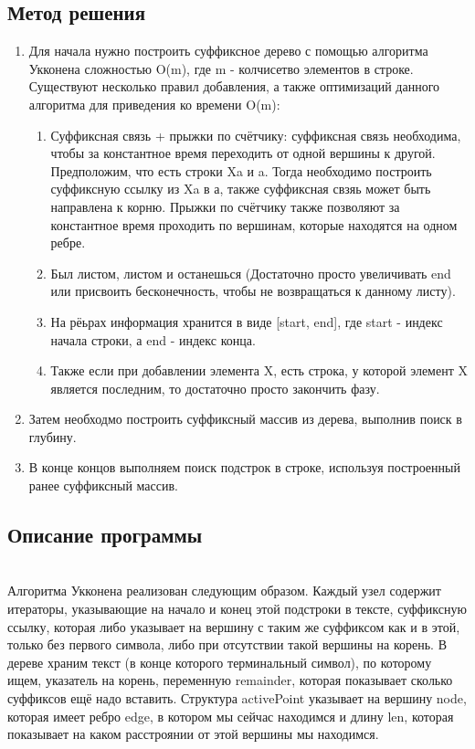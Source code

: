 \documentclass[12pt]{article}
\begin{document}
\subsection*{Метод решения}

\begin{enumerate}
\item Для начала нужно построить суффиксное дерево с помощью алгоритма Укконена сложностью O(m), где m - колчисетво элементов в строке.\\

Существуют несколько правил добавления, а также оптимизаций данного алгоритма для приведения ко времени O(m): 
\begin{enumerate}
    \item Суффиксная связь + прыжки по счётчику: суффиксная связь необходима, чтобы за константное время переходить от одной вершины к другой. Предположим, что есть строки Xa и a. Тогда необходимо построить суффиксную ссылку из Xa в а, также суффиксная свзяь может быть направлена к корню. Прыжки по счётчику также позволяют за константное время проходить по вершинам, которые находятся на одном ребре.
    \item Был листом, листом и останешься (Достаточно просто увеличивать end или присвоить бесконечность, чтобы не возвращаться к данному листу).
    \item На рёьрах информация хранится в виде [start, end], где start - индекс начала строки, а end - индекс конца.
    \item Также если при добавлении элемента X, есть строка, у которой элемент X является последним, то достаточно просто закончить фазу.
\end{enumerate}
\item Затем необходмо построить суффиксный массив из дерева, выполнив поиск в глубину.
\item В конце концов выполняем поиск подстрок в строке, используя построенный ранее суффиксный массив.
\end{enumerate}

\subsection*{Описание программы}
\\

Алгоритма Укконена реализован следующим образом. Каждый узел содержит итераторы, указывающие на начало и конец этой подстроки в тексте, суффиксную ссылку, которая либо указывает на вершину с таким же суффиксом как и в этой, только без первого символа, либо при отсутствии такой вершины на корень. В дереве храним текст (в конце которого терминальный символ), по которому ищем, указатель на корень, переменную remainder, которая показывает сколько суффиксов ещё надо вставить. Структура activePoint указывает на вершину node, которая имеет ребро edge, в котором мы сейчас находимся и длину len, которая показывает на каком расстроянии от этой вершины мы находимся.\\
\end{document}
